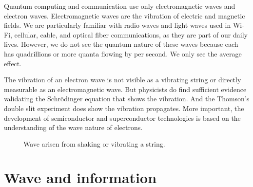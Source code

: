 \documentclass[Letter,11pt]{book}
\begin{document}
Quantum computing and communication use only electromagnetic waves and electron waves. Electromagnetic waves are the vibration of electric and magnetic fields. We are particularly familiar with radio waves and light waves used in Wi-Fi, cellular, cable, and optical fiber communications, as they are part of our daily lives. However, we do not see the quantum nature of these waves because each has quadrillions or more quanta flowing by per second. We only see the average effect.

The vibration of an electron wave is not visible as a vibrating string or directly measurable as an electromagnetic wave. But physicists do find sufficient evidence validating the Schrödinger equation that shows the vibration. And the Thomson's double slit experiment\cite{THOMSON} does show the vibration propagates. More important, the development of semiconductor and superconductor technologies is based on the understanding of the wave nature of electrons.

\begin{figure}[ht]
\caption{Wave arisen from shaking or vibrating a string.}
\label{String}
\end{figure}

\section{Wave and information}
\end{document}
